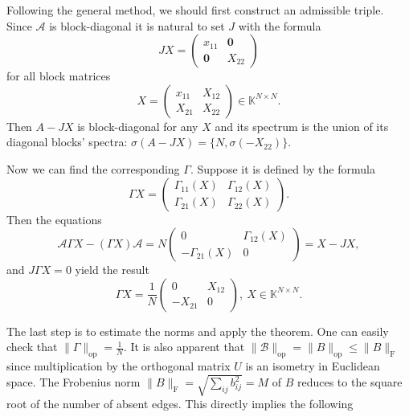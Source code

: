 \documentclass[a4paper]{article}
\theoremstyle{definition}
\begin{document}
Following the general method,
    we should first construct an admissible triple.
Since \( \mathcal{A} \) is block-diagonal
    it is natural to set \( J \) with the formula
    \[
        JX =
        \left(\begin{array}{c|c}
            x_{11} & \mathbf{0} \\ \hline
            \mathbf{0} & X_{22}
        \end{array}\right)
    \]
    for all block matrices
    \[
        X =
        \left(\begin{array}{c|c}
            x_{11} & X_{12} \\ \hline
            X_{21} & X_{22}
        \end{array}\right)\in\mathbb{K}^{N{\times}N}.
    \]
Then \( A - JX \) is block-diagonal for any \( X \)
    and its spectrum is the union
    of its diagonal blocks' spectra:
    \( \sigma(A - JX) = \{N, \sigma(-X_{22}) \} \).

Now we can find the corresponding \( \Gamma \).
Suppose it is defined by the formula
    \[ \Gamma X = \begin{pmatrix}
        \Gamma_{11}(X) & \Gamma_{12}(X) \\
        \Gamma_{21}(X) & \Gamma_{22}(X)
        \end{pmatrix}.
    \]
Then the equations
    \[
        \mathcal{A} \Gamma X - (\Gamma X)\mathcal{A} =
        N
        \begin{pmatrix}
          0 & \Gamma_{12}(X) \\
          -\Gamma_{21}(X) & 0
        \end{pmatrix} = X - JX,
     \]
and \( J\Gamma X = 0 \) yield the result
    \[
        \Gamma X = \frac{1}{N} \begin{pmatrix} 0 & X_{12} \\ -X_{21} & 0 \end{pmatrix},\ X\in\mathbb{K}^{N{\times}N}.
    \]

The last step is to estimate the norms and apply the theorem.
One can easily check that \( \|\Gamma\|_{\mathrm{op}} = \frac1N \).
It is also apparent that \( \|\mathcal{B}\|_{\mathrm{op}} = \|B\|_{\mathrm{op}} \leq \|B\|_{\mathrm{F}} \)
    since multiplication by the orthogonal matrix \( U \)
    is an isometry in Euclidean space.
The Frobenius norm \( {\|B\|_{\mathrm{F}} = \sqrt{\sum_{ij} b_{ij}^2} = M} \)
    of \( B \)
    reduces to the square root of the number of absent edges.
This directly implies the following
\end{document}
